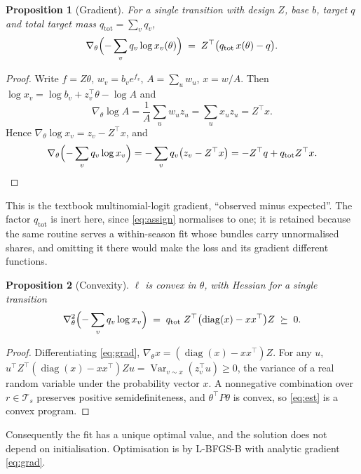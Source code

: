 \documentclass[11pt]{article}
\newtheorem{proposition}{Proposition}
\theoremstyle{remark}
\DeclareMathOperator{\Var}{Var}
\newcommand{\1}{\mathbf{1}}
\begin{document}
\begin{proposition}[Gradient]\label{prop:grad}
For a single transition with design $Z$, base $b$, target $q$ and total target mass
$q_{\mathrm{tot}} = \sum_v q_v$,
\begin{equation}
  \nabla_\theta \Bigl(-\sum_v q_v \log x_v(\theta)\Bigr)
  \;=\; Z^\top\bigl(q_{\mathrm{tot}}\, x(\theta) - q\bigr).
  \label{eq:grad}
\end{equation}
\end{proposition}
\begin{proof}
Write $f = Z\theta$, $w_v = b_v e^{f_v}$, $A = \sum_u w_u$, $x = w/A$. Then
$\log x_v = \log b_v + z_v^\top\theta - \log A$ and
\[
  \nabla_\theta \log A
  = \frac{1}{A}\sum_u w_u z_u = \sum_u x_u z_u = Z^\top x .
\]
Hence $\nabla_\theta \log x_v = z_v - Z^\top x$, and
\[
  \nabla_\theta\Bigl(-\sum_v q_v \log x_v\Bigr)
  = -\sum_v q_v\bigl(z_v - Z^\top x\bigr)
  = -Z^\top q + q_{\mathrm{tot}} Z^\top x . \qedhere
\]
\end{proof}

This is the textbook multinomial-logit gradient, ``observed minus expected''. The factor
$q_{\mathrm{tot}}$ is inert here, since \eqref{eq:assign} normalises to one; it is
retained because the same routine serves a within-season fit whose bundles carry unnormalised
shares, and omitting it there would make the loss and its gradient different functions.

\begin{proposition}[Convexity]\label{prop:convex}
$\ell$ is convex in $\theta$, with Hessian for a single transition
\begin{equation}
  \nabla^2_\theta \Bigl(-\sum_v q_v \log x_v\Bigr)
  \;=\; q_{\mathrm{tot}}\; Z^\top\bigl(\operatorname{diag}(x) - x x^\top\bigr) Z \;\succeq\; 0 .
\end{equation}
\end{proposition}
\begin{proof}
Differentiating \eqref{eq:grad}, $\nabla_\theta x = (\operatorname{diag}(x) - xx^\top)Z$.
For any $u$, $u^\top Z^\top(\operatorname{diag}(x) - xx^\top)Zu = \Var_{v\sim x}(z_v^\top u) \ge 0$,
the variance of a real random variable under the probability vector $x$. A nonnegative
combination over $r \in \mathcal{T}_s$ preserves positive semidefiniteness, and
$\theta^\top P\theta$ is convex, so \eqref{eq:est} is a convex program.
\end{proof}

Consequently the fit has a unique optimal value, and the solution does not depend on
initialisation. Optimisation is by L-BFGS-B with analytic gradient \eqref{eq:grad}.
\end{document}
